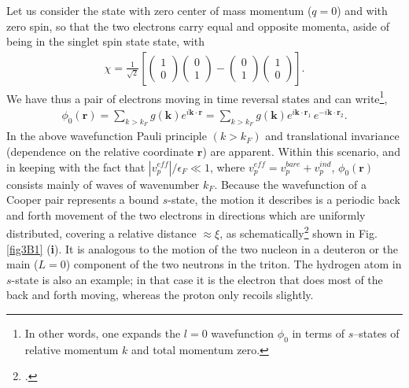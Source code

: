 Let us consider the state with zero center of mass momentum ($q=0$) and with zero spin, so that the two electrons carry  equal and opposite momenta, aside of being in the singlet spin state state, with
\begin{align}\label{eq3B2}
\chi=\frac{1}{\sqrt{2}}\left[
\left(\begin{array}{c}
1\\ 
0
\end{array} \right)
\left(\begin{array}{c}
0\\ 
1
\end{array} \right)-
\left(\begin{array}{c}
0\\ 
1
\end{array} \right)
\left(\begin{array}{c}
1\\ 
0
\end{array} \right)
\right].
\end{align}
 We have thus a pair of electrons moving in time reversal states and can write\footnote{In other words, one expands the $l=0$ wavefunction $\phi_0$ in terms of $s$--states of relative momentum $k$ and total momentum zero.},
\begin{align}\label{eq3B3}
\phi_0(\mathbf r)=\sum_{k>k_F}g(\mathbf k)e^{i\mathbf k\cdot\mathbf r}=\sum_{k>k_F}g(\mathbf k)e^{i\mathbf k\cdot\mathbf r_1}\,e^{-i\mathbf k\cdot\mathbf r_2}.
\end{align}
In the above wavefunction Pauli principle $(k>k_F)$ and translational invariance (dependence on the relative coordinate $\mathbf r$) are apparent. 
Within this scenario, and in keeping with the fact that $|v^{eff}_p|/\epsilon_F\ll1$, where $v_p^{eff}=v^{bare}_p+v^{ind}_p$,  $\phi_0(\mathbf r)$ consists mainly of waves of wavenumber $k_F$. Because the wavefunction of a Cooper pair represents a bound $s$-state, the motion it describes is a periodic back and forth movement of the two electrons in  directions which are uniformly distributed, covering a relative distance $\approx\xi$, as schematically\footnote{\cite{Weisskopf:81}.} shown in Fig. \ref{fig3B1} (\textbf{i}). It is analogous to the motion of the two nucleon in a deuteron or the main ($L=0$) component of the two neutrons in the triton. The hydrogen atom in $s$-state is also an example; in that case it is the electron that does most of the back and forth moving, whereas the proton only recoils slightly.

